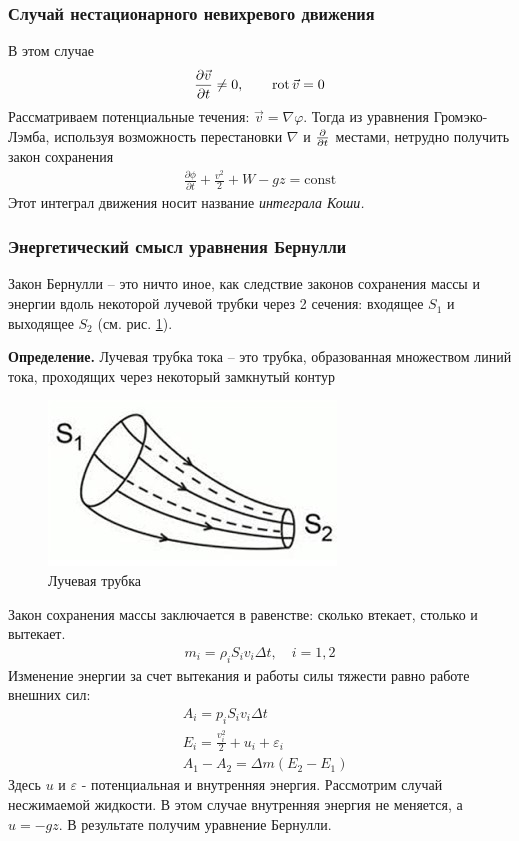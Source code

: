 \subsubsection{Случай нестационарного невихревого движения}
В этом случае
\begin{align*}
	\frac { \partial \vec{v} } { \partial t } \neq 0, \qquad
	\operatorname{rot} \vec{v} = 0
\end{align*}
Рассматриваем  потенциальные течения: $ \vec{v} = \nabla \varphi $. Тогда из уравнения Громэко-Лэмба, используя возможность перестановки $\nabla$ и $\pdv{t}$ местами, нетрудно получить закон сохранения
\begin{align*}
\frac { \partial \phi } { \partial t } + \frac { v ^ { 2 } } { 2 } + W - g z = \mathrm { const }
\end{align*}
Этот интеграл движения носит название \textit{интеграла Коши.}

\subsubsection{Энергетический смысл уравнения Бернулли}

Закон Бернулли --  это ничто иное, как следствие законов сохранения массы и энергии вдоль некоторой лучевой трубки через 2 сечения: входящее $S_1$ и выходящее $S_2$ (см. рис. \ref{fig:figure7}).

\textbf{Определение. } Лучевая трубка тока -- это трубка, образованная множеством линий тока, проходящих через некоторый замкнутый контур
\begin{figure}[H]
	\centering
	\includegraphics[scale=1]{photo/trubka.jpg}
	\caption{Лучевая трубка}
	\label{fig:figure7}
\end{figure}

Закон сохранения массы заключается в равенстве: сколько втекает, столько и вытекает.
\begin{align*}
m _ { i } = \rho _ { i } S _ { i } v _ { i } \Delta t , \quad i = 1,2
\end{align*}
Изменение энергии за счет вытекания и работы силы тяжести равно работе внешних сил:
\begin{align*}
& A _ { i } = p _ { i } S _ { i } v _ { i } \Delta t \\
& E _ { i } = \frac { v _ { i } ^ { 2 } } { 2 } + u _ { i } + \varepsilon _ { i } \\
& A _ { 1 } - A _ { 2 } = \Delta m \left( E _ { 2 } - E _ { 1 } \right)
\end{align*}
Здесь $u$ и $\varepsilon$ - потенциальная и внутренняя энергия. Рассмотрим случай несжимаемой жидкости. В этом случае внутренняя энергия не меняется, а $ u = - g z $. В результате получим уравнение Бернулли.



